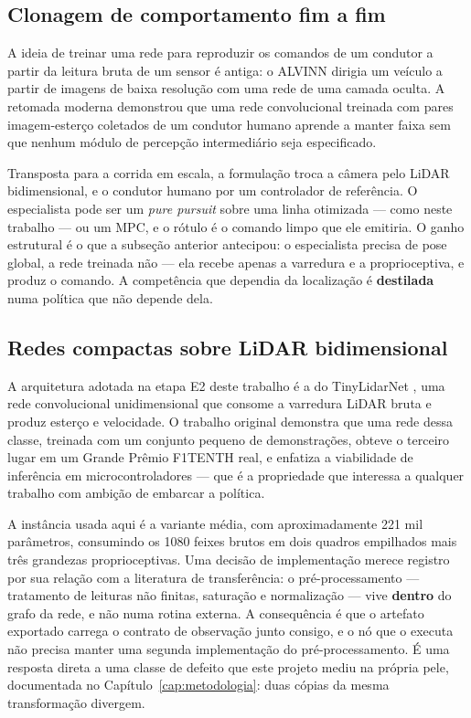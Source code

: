\subsection{Clonagem de comportamento fim a fim}

A ideia de treinar uma rede para reproduzir os comandos de um condutor a partir
da leitura bruta de um sensor é antiga: o ALVINN \cite{Pomerleau1989ALVINN}
dirigia um veículo a partir de imagens de baixa resolução com uma rede de uma
camada oculta. A retomada moderna \cite{Bojarski2016EndToEnd} demonstrou que uma
rede convolucional treinada com pares imagem-esterço coletados de um condutor
humano aprende a manter faixa sem que nenhum módulo de percepção intermediário
seja especificado.

Transposta para a corrida em escala, a formulação troca a câmera pelo LiDAR
bidimensional, e o condutor humano por um controlador de referência. O
especialista pode ser um \textit{pure pursuit} sobre uma linha otimizada --- como
neste trabalho --- ou um MPC, e o rótulo é o comando limpo que ele emitiria. O
ganho estrutural é o que a subseção anterior antecipou: o especialista precisa de
pose global, a rede treinada não --- ela recebe apenas a varredura e a
proprioceptiva, e produz o comando. A competência que dependia da localização é
\textbf{destilada} numa política que não depende dela.

\subsection{Redes compactas sobre LiDAR bidimensional}

A arquitetura adotada na etapa E2 deste trabalho é a do TinyLidarNet
\cite{Zarrar2024TinyLidarNet}, uma rede convolucional unidimensional que consome
a varredura LiDAR bruta e produz esterço e velocidade. O trabalho original
demonstra que uma rede dessa classe, treinada com um conjunto pequeno de
demonstrações, obteve o terceiro lugar em um Grande Prêmio F1TENTH real, e
enfatiza a viabilidade de inferência em microcontroladores --- que é a
propriedade que interessa a qualquer trabalho com ambição de embarcar a política.

A instância usada aqui é a variante média, com aproximadamente 221 mil
parâmetros, consumindo os 1080 feixes brutos em dois quadros empilhados mais três
grandezas proprioceptivas. Uma decisão de implementação merece registro por sua
relação com a literatura de transferência: o pré-processamento --- tratamento de
leituras não finitas, saturação e normalização --- vive \textbf{dentro} do grafo
da rede, e não numa rotina externa. A consequência é que o artefato exportado
carrega o contrato de observação junto consigo, e o nó que o executa não precisa
manter uma segunda implementação do pré-processamento. É uma resposta direta a
uma classe de defeito que este projeto mediu na própria pele, documentada no
Capítulo~\ref{cap:metodologia}: duas cópias da mesma transformação divergem.

